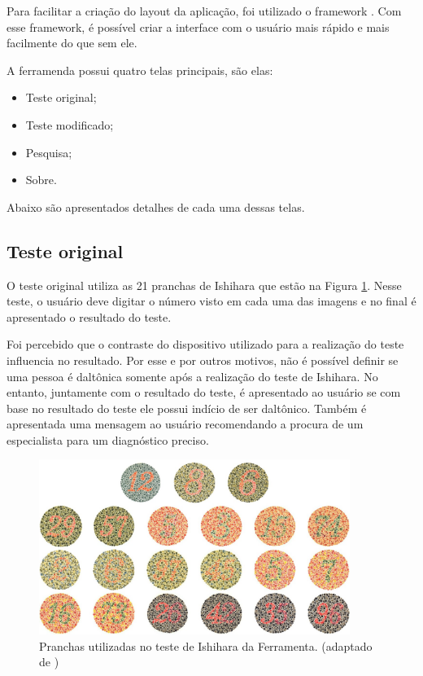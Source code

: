 \documentclass[	12pt, Times, openright, twoside, a4paper, english, brazil]{abntex2}
\begin{document}
Para facilitar a criação do layout da aplicação, foi utilizado o framework . Com esse framework, é possível criar a interface com o usuário mais rápido e mais facilmente do que sem ele.

A ferramenda possui quatro telas principais, são elas:

\begin{itemize}
\item Teste original;
\item Teste modificado;
\item Pesquisa;
\item Sobre.
\end{itemize}

Abaixo são apresentados detalhes de cada uma dessas telas.

\subsection{Teste original}
O teste original utiliza as 21 pranchas de Ishihara que estão na Figura \ref{fig:figuraTesteOriginalFerramenta}. Nesse teste, o usuário deve digitar o número visto em cada uma das imagens e no final é apresentado o resultado do teste. 

Foi percebido que o contraste do dispositivo utilizado para a realização do teste influencia no resultado. Por esse e por outros motivos, não é possível definir se uma pessoa é daltônica somente após a realização do teste de Ishihara. No entanto, juntamente com o resultado do teste, é apresentado ao usuário se com base no resultado do teste ele possui indício de ser daltônico. Também é apresentada uma mensagem ao usuário recomendando a procura de um especialista para um diagnóstico preciso.

\begin{figure}[!htb]
\centering \includegraphics[width=0.9\textwidth]{pranchas.JPG}
\caption{Pranchas utilizadas no teste de Ishihara da Ferramenta. (adaptado de )} \label{fig:figuraTesteOriginalFerramenta}
\end{figure}
\end{document}
